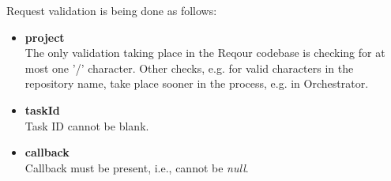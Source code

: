 \documentclass[../main.text]{subfiles}
\begin{document}
Request validation is being done as follows:

\begin{itemize}
    \item \textbf{project}\\
    The only validation taking place in the Reqour codebase is checking for at most one '/' character. Other checks, e.g. for valid characters in the repository name, take place sooner in the process, e.g. in Orchestrator.

    \item \textbf{taskId}\\
    Task ID cannot be blank.

    \item \textbf{callback}\\
    Callback must be present, i.e., cannot be \textit{null}.
\end{itemize}
\end{document}
